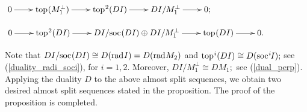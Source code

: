 \documentclass[10pt]{amsart}
\newtheorem{Lemma}[Theo]{Lemma}
\theoremstyle{definition}
\newcommand{\rad}{{\rm rad}\hspace{.5pt}}
\newcommand{\soc}{{\rm soc}\hspace{.5pt}}
\newcommand{\ntop}{{\rm top}\hspace{.5pt}}
\newcommand{\vp}{\vspace{.5pt}}
\begin{document}
\vp\vp

$\xymatrixcolsep{22pt}\xymatrix{0\ar[r] & \ntop(M_1^\perp) \ar[r] & \ntop^2(DI) \ar[r]  & DI/M_1^\perp \ar[r] & 0;}$

\vspace{-2pt}

$\xymatrixcolsep{22pt}\xymatrix{0\ar[r] & \ntop^2(DI) \ar[r] & DI/\soc(DI) \oplus DI/M_1^\perp \ar[r] & \ntop(DI) \ar[r] & 0.}$ 

\vspace{1pt}

Note that $DI/\soc(DI) \cong D(\rad I)=D(\rad M_2)$ and  $\ntop^i(DI)\cong D(\soc^i\hspace{-1pt}I);$ see (\ref{duality_radi_soci}), for $i=1, 2$. Moreover, $DI/M_1^\perp \cong DM_1;$ see (\ref{dual_perp}). Applying the duality $D$ to the above almost split sequences, we obtain two desired almost split sequences stated in the proposition. The proof of the proposition is completed.

%
\end{document}
